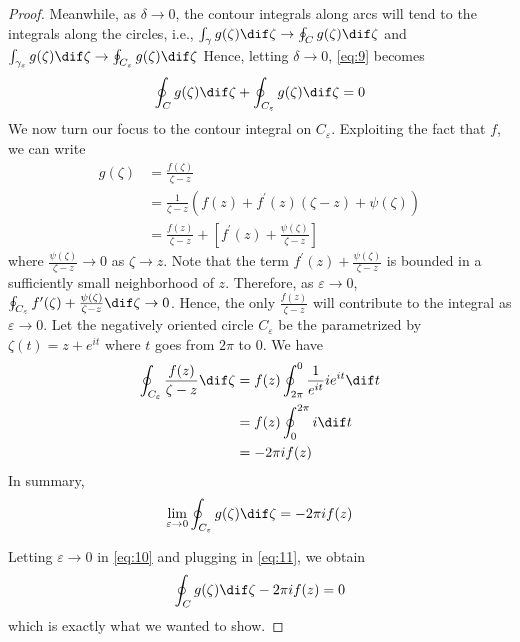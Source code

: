 \documentclass[thmcnt=section, color=cyan, 12pt]{my-elegantbook}
\begin{document}
\begin{proof}
    Meanwhile, as $\delta \to 0$,
    the contour integrals along arcs will tend to
    the integrals along the circles, i.e.,
    $\int_\gamma g(\zeta) \dif \zeta \to \oint_C g(\zeta) \dif \zeta$
    and $\int_{\gamma_{\varepsilon}} g(\zeta) \dif \zeta \to \oint_{C_\varepsilon} g(\zeta) \dif \zeta$
    Hence, letting $\delta \to 0$, \eqref{eq:9} becomes
    \begin{align}
        \oint_C g(\zeta) \dif \zeta
        + \oint_{C_\varepsilon} g(\zeta) \dif \zeta
        = 0
        \label{eq:10}
    \end{align}
    We now turn our focus to the contour integral on $C_\varepsilon$.
	Exploiting the fact that $f$, we can write 
	\begin{align*}
		g(\zeta) &= \frac{f(\zeta)}{\zeta - z} \\
				 &= \frac{1}{\zeta - z} (
				 f(z) + f^\prime(z) (\zeta - z) + \psi(\zeta)
				 ) \\
				 &= \frac{f(z)}{\zeta - z} + \left[
					 f^\prime(z) + \frac{\psi(\zeta)}{\zeta - z}
				 \right]
	\end{align*}
	where $\frac{\psi(\zeta)}{\zeta - z} \to 0$ as $\zeta \to z$.
	Note that the term $f^\prime(z) + \frac{\psi(\zeta)}{\zeta - z}$ is bounded
	in a sufficiently small neighborhood of $z$.
	Therefore, as $\varepsilon \to 0$, $\oint_{C_\varepsilon} f^\prime(\zeta) + \frac{\psi(\zeta)}{\zeta - z} \dif \zeta \to 0$.
	Hence, the only $\frac{f(z)}{\zeta - z}$ will contribute to 
	the integral as $\varepsilon \to 0$.
	Let the negatively oriented 
	circle $C_\varepsilon$ be the parametrized by $\zeta(t) = z + e^{i t}$
	where $t$ goes from $2\pi$ to $0$.
	We have
	\begin{align*}
		\oint_{C_\varepsilon} \frac{f(z)}{\zeta - z} \dif \zeta
		&= f(z) \oint_{2 \pi}^{0} \frac{1}{e^{i t}} i e^{i t} \dif t \\
		&= f(z) \oint_{0}^{2 \pi} i \dif t \\ 
		&= - 2 \pi i f(z)
	\end{align*}
	In summary,
	\begin{align}
		\lim_{\varepsilon \to 0} \oint_{C_\varepsilon} g(\zeta) \dif \zeta = - 2 \pi i f(z)
		\label{eq:11}
	\end{align}

	Letting $\varepsilon \to 0$ in \eqref{eq:10} and plugging in \eqref{eq:11}, 
	we obtain
	\begin{align*}
		\oint_C g(\zeta) \dif \zeta - 2 \pi i f(z) = 0
	\end{align*}
	which is exactly what we wanted to show.
\end{proof}
\end{document}
